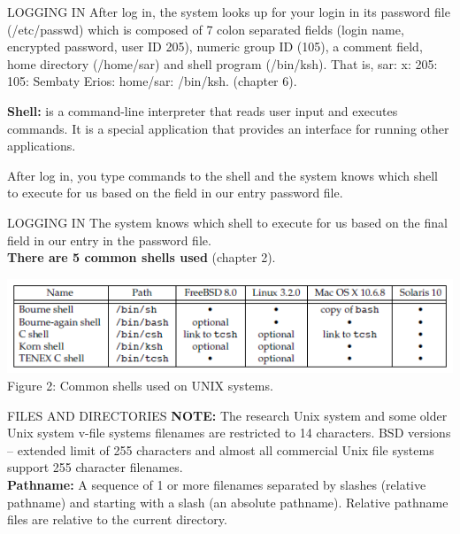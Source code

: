\documentclass{beamer}
\begin{document}
\begin{frame}[t]{LOGGING IN}\vspace{10pt}
After log in, the system looks up for your login in its password file (/etc/passwd) which is composed of 7 colon separated fields (login name, encrypted password, user ID 205), numeric group ID (105), a comment field, home directory (/home/sar) and shell program (/bin/ksh). That is, sar: x: 205: 105: Sembaty Erios: home/sar: /bin/ksh. (chapter 6).

\textbf{Shell:} is a command-line interpreter that reads user input and executes commands. It is a special application that provides an interface for running other applications.

After log in, you type commands to the shell and the system knows which shell to execute for us based on the field in our entry password file. 

\end{frame}

\begin{frame}[t]{LOGGING IN}\vspace{10pt}
The system knows which shell to execute for us based on the final field in our entry in the password file.\\[10pt]\textbf{There are 5 common shells used} (chapter 2).

\includegraphics[scale=0.5]{shellstable.png}\\[6pt]
Figure 2: Common shells used on UNIX systems.


\end{frame}

\begin{frame}[t]{FILES AND DIRECTORIES}
\textbf{NOTE:} The research Unix system and some older Unix system v-file systems filenames are restricted to 14 characters. BSD versions – extended limit of 255 characters and almost all commercial Unix file systems support 255 character filenames.
\\[10pt]\textbf{Pathname:} A sequence of 1 or more filenames separated by slashes (relative pathname) and starting with a slash (an absolute pathname). Relative pathname files are relative to the current directory.

\end{frame}
\end{document}
